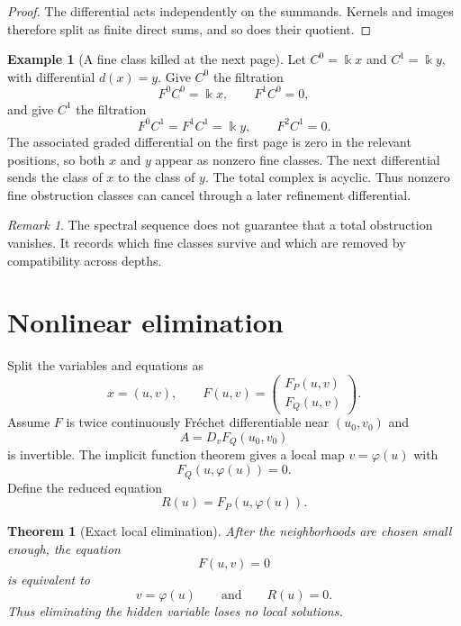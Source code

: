 \documentclass{aomart}
\newtheorem{theorem}{Theorem}[section]
\theoremstyle{definition}
\newtheorem{example}[example]{Example}
\theoremstyle{remark}
\newtheorem{remark}[remark]{Remark}
\newcommand{\bbk}{\Bbbk}
\begin{document}
\begin{proof}
The differential acts independently on the summands.  Kernels and images therefore split as finite direct sums, and so does their quotient.
\end{proof}

\begin{example}[A fine class killed at the next page]\label{ex:spectral_cancellation}
Let $C^0=\bbk x$ and $C^1=\bbk y$, with differential $d(x)=y$.  Give $C^0$ the filtration
\[
F^0C^0=\bbk x,
\qquad
F^1C^0=0,
\]
and give $C^1$ the filtration
\[
F^0C^1=F^1C^1=\bbk y,
\qquad
F^2C^1=0.
\]
The associated graded differential on the first page is zero in the relevant positions, so both $x$ and $y$ appear as nonzero fine classes.  The next differential sends the class of $x$ to the class of $y$.  The total complex is acyclic.  Thus nonzero fine obstruction classes can cancel through a later refinement differential.
\end{example}

\begin{remark}\label{rem:spectral_sequence_meaning}
The spectral sequence does not guarantee that a total obstruction vanishes.  It records which fine classes survive and which are removed by compatibility across depths.
\end{remark}

\section{Nonlinear elimination}\label{sec:nonlinear_elimination}

Split the variables and equations as
\[
x=(u,v),
\qquad
F(u,v)=
\begin{pmatrix}
F_P(u,v)\\
F_Q(u,v)
\end{pmatrix}.
\]
Assume $F$ is twice continuously Fr\'echet differentiable near $(u_0,v_0)$ and
\[
A=D_vF_Q(u_0,v_0)
\]
is invertible.  The implicit function theorem gives a local map $v=\varphi(u)$ with
\[
F_Q(u,\varphi(u))=0.
\]
Define the reduced equation
\[
R(u)=F_P(u,\varphi(u)).
\]

\begin{theorem}[Exact local elimination]\label{thm:exact_local_elimination}
After the neighborhoods are chosen small enough, the equation
\[
F(u,v)=0
\]
is equivalent to
\[
v=\varphi(u)
\qquad\text{and}\qquad
R(u)=0.
\]
Thus eliminating the hidden variable loses no local solutions.
\end{theorem}
\end{document}
